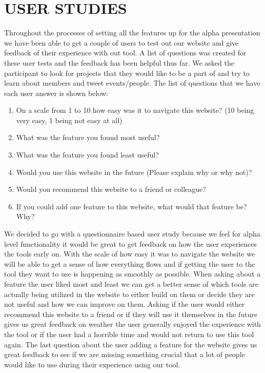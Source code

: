 \documentclass[letterpaper,10pt,onecolumn]{IEEEtran} %
\begin{document}
\section{USER STUDIES}
Throughout the processes of setting all the features up for the alpha
presentation we have been able to get a couple of users to test out our website
and give feedback of their experience with out tool. A list of questions was
created for these user tests and the feedback has been helpful thus far. We
asked the participant to look for projects that they would like to be a part of
and try to learn about members and tweet events/people. The list of questions
that we have each user answer is shown below: \\

\begin{enumerate}
  \item On a scale from 1 to 10 how easy was it to navigate this website? (10
    being very easy, 1 being not easy at all)
  \item What was the feature you found most useful?
  \item What was the feature you found least useful?
  \item Would you use this website in the future (Please explain why or why
    not)?
  \item Would you recommend this website to a friend or colleague?
  \item If you could add one feature to this website, what would that feature
    be? Why? \\
\end{enumerate}

We decided to go with a questionnaire based user study because we feel for alpha
level functionality it would be great to get feedback on how the user
experiences the tools early on. With the scale of how easy it was to navigate
the website we will be able to get a sense of how everything flows and if
getting the user to the tool they want to use is happening as smoothly as
possible. When asking about a feature the user liked most and least we can get a
better sense of which tools are actually being utilized in the website to either
build on them or decide they are not useful and how we can improve on them.
Asking if the user would either recommend this website to a friend or if they
will use it themselves in the future gives us great feedback on weather the user
generally enjoyed the experience with the tool or if the user had a horrible
time and would not return to use this tool again. The last question about the
user adding a feature for the website gives us great feedback to see if we are
missing something crucial that a lot of people would like to use during their
experience using our tool.
\end{document}
